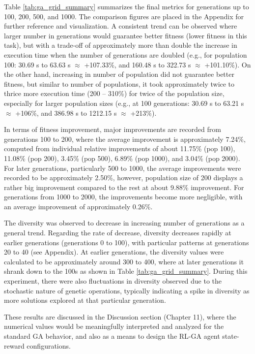 \documentclass{article}
\begin{document}
Table \ref{tab:ga_grid_summary} summarizes the final metrics for generations up to 100, 200, 500, and 1000. The comparison figures are placed in the Appendix for further reference and visualization. A consistent trend can be observed where larger number in generations would guarantee better fitness (lower fitness in this task), but with a trade-off of approximately more than double the increase in execution time when the number of generations are doubled (e.g., for population 100: 30.69 s to 63.63 s $\approx$ +107.33\%, and 160.48 s to 322.73 s $\approx$ +101.10\%). On the other hand, increasing in number of population did not guarantee better fitness, but similar to number of populations, it took approximately twice to thrice more execution time (200 – 310\%) for twice of the population size, especially for larger population sizes (e.g., at 100 generations: 30.69 s to 63.21 s $\approx$ +106\%, and 386.98 s to 1212.15 s $\approx$ +213\%).

In terms of fitness improvement, major improvements are recorded from generations 100 to 200, where the average improvement is approximately 7.24\%, computed from individual relative improvements of about 11.75\% (pop 100), 11.08\% (pop 200), 3.45\% (pop 500), 6.89\% (pop 1000), and 3.04\% (pop 2000). For later generations, particularly 500 to 1000, the average improvements were recorded to be approximately 2.50\%, however, population size of 200 displays a rather big improvement compared to the rest at about 9.88\% improvement. For generations from 1000 to 2000, the improvements become more negligible, with an average improvement of approximately 0.26\%.

The diversity was observed to decrease in increasing number of generations as a general trend. Regarding the rate of decrease, diversity decreases rapidly at earlier generations (generations 0 to 100), with particular patterns at generations 20 to 40 (see Appendix). At earlier generations, the diversity values were calculated to be approximately around 300 to 400, where at later generations it shrank down to the 100s as shown in Table \ref{tab:ga_grid_summary}. During this experiment, there were also fluctuations in diversity observed due to the stochastic nature of genetic operations, typically indicating a spike in diversity as more solutions explored at that particular generation. 

These results are discussed in the Discussion section (Chapter 11), where the numerical values would be meaningfully interpreted and analyzed for the standard GA behavior, and also as a means to design the RL-GA agent state-reward configurations.
\end{document}
